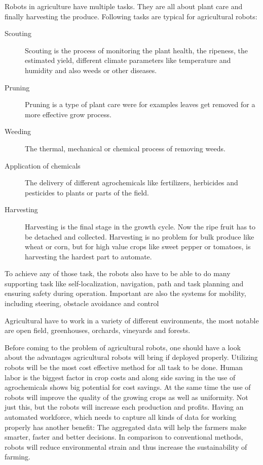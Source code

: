     Robots in agriculture have multiple tasks. They are all about plant care and finally harvesting the produce. Following tasks are typical for agricultural robots: 
    \begin{description}
        \item[Scouting] Scouting is the process of monitoring the plant health, the ripeness, the estimated yield, different climate parameters like temperature and humidity and also weeds or other diseases.
        \item[Pruning] Pruning is a type of plant care were for examples leaves get removed for a more effective grow process.
        \item[Weeding] The thermal, mechanical or chemical process of removing weeds.
        \item[Application of chemicals] The delivery of different agrochemicals like fertilizers, herbicides and pesticides to plants or parts of the field.
        \item[Harvesting] Harvesting is the final stage in the growth cycle. Now the ripe fruit has to be detached and collected. Harvesting is no problem for bulk produce like wheat or corn, but for high value crops like sweet pepper or tomatoes, is harvesting the hardest part to automate.
    \end{description}

    To achieve any of those task, the robots also have to be able to do many supporting task like self-localization, navigation, path and task planning and ensuring safety during operation. Important are also the systems for mobility, including steering, obstacle avoidance and control

    Agricultural have to work in a variety of different environments, the most notable are open field, greenhouses, orchards, vineyards and forests.

    Before coming to the problem of agricultural robots, one should have a look about the advantages agricultural robots will bring if deployed properly. Utilizing robots will be the most cost effective method for all task to be done. Human labor is the biggest factor in crop costs and along side saving in the use of agrochemicals shows big potential for cost savings. At the same time the use of robots will improve the quality of the growing crops as well as uniformity. Not just this, but the robots will increase each production and profits. Having an automated workforce, which needs to capture all kinds of data for working properly has another benefit: The aggregated data will help the farmers make smarter, faster and better decisions. In comparison to conventional methods, robots will reduce environmental strain and thus increase the sustainability of farming. \cite{Bechar2016}

